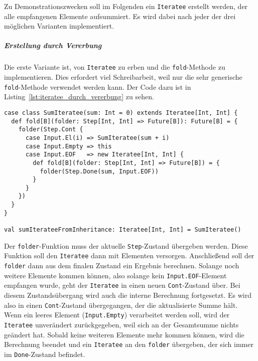\documentclass[draft=false
              ,paper=a4
              ,twoside=false
              ,fontsize=11pt
              ,headsepline
              ,BCOR10mm
              ,DIV11
              ]{scrbook}
\begin{document}
Zu Demonstrationszwecken soll im Folgenden ein \lstinline|Iteratee| erstellt werden, der alle empfangenen Elemente aufsummiert.
Es wird dabei nach jeder der drei möglichen Varianten implementiert.

\subparagraph{Erstellung durch Vererbung} %
\label{subp:erstellung_durch_vererbung}\mbox{} %

Die erste Variante ist, von \lstinline|Iteratee| zu erben und die \lstinline|fold|-Methode zu implementieren.
Dies erfordert viel Schreibarbeit, weil nur die sehr generische \lstinline|fold|-Methode verwendet werden kann.
Der Code dazu ist in Listing~\ref{lst:iteratee_durch_vererbung} zu sehen.

\begin{lstlisting}[caption=Erstellung eines Iteratees durch Vererbung, label=lst:iteratee_durch_vererbung]
case class SumIteratee(sum: Int = 0) extends Iteratee[Int, Int] {
  def fold[B](folder: Step[Int, Int] => Future[B]): Future[B] = {
    folder(Step.Cont {
      case Input.El(i) => SumIteratee(sum + i)
      case Input.Empty => this
      case Input.EOF   => new Iteratee[Int, Int] {
        def fold[B](folder: Step[Int, Int] => Future[B]) = {
          folder(Step.Done(sum, Input.EOF))
        }
      }
    })
  }
}

val sumIterateeFromInheritance: Iteratee[Int, Int] = SumIteratee()
\end{lstlisting}

Der \lstinline|folder|-Funktion muss der aktuelle \lstinline|Step|-Zustand übergeben werden.
Diese Funktion soll den \lstinline|Iteratee| dann mit Elementen versorgen.
Anschließend soll der \lstinline|folder| dann aus dem finalen Zustand ein Ergebnis berechnen.
Solange noch weitere Elemente kommen können, also solange kein \lstinline|Input.EOF|-Element empfangen wurde, geht der \lstinline|Iteratee| in einen neuen \lstinline|Cont|-Zustand über.
Bei diesem Zustandsübergang wird auch die interne Berechnung fortgesetzt.
Es wird also in einen \lstinline|Cont|-Zustand übergegangen, der die aktualisierte Summe hält.
Wenn ein leeres Element (\lstinline|Input.Empty|) verarbeitet werden soll, wird der \lstinline|Iteratee| unverändert zurückgegeben, weil sich an der Gesamtsumme nichts geändert hat.
Sobald keine weiteren Elemente mehr kommen können, wird die Berechnung beendet und ein \lstinline|Iteratee| an den \lstinline|folder| übergeben, der sich immer im \lstinline|Done|-Zustand befindet.

\end{document}
